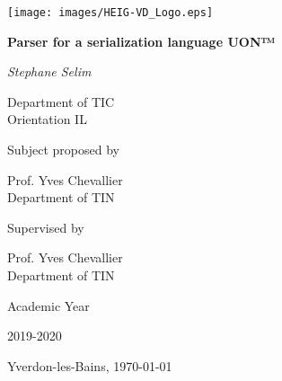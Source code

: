 \documentclass[12pt]{article}
\begin{document}
\thispagestyle{empty}
\setlength\headheight{0pt} 
\begin{center}

\begin{center}
\texttt{[image: images/HEIG-VD\_Logo.eps]}            
\end{center}	

        \vspace*{\fill}
        {\Large\bfseries Parser for a serialization language UON™\par}
        
        \vspace{0.5cm}
        {\Large\itshape Stephane Selim\par}
        Department of TIC \\
        Orientation IL
        \vspace{0.25cm}

\vspace{1cm}
Subject proposed by\par
Prof. Yves Chevallier \\
Department of TIN\par

\vspace{1cm}
Supervised by\par
Prof. Yves Chevallier \\
Department of TIN\par

\vspace{1cm}
Academic Year\par
2019-2020\par

\large
\vfill
\begin{flushright}
Yverdon-les-Bains, \today
\end{flushright}

\vspace*{\fill}
\end{center}

\clearpage
\restoregeometry
\justify
\end{document}
